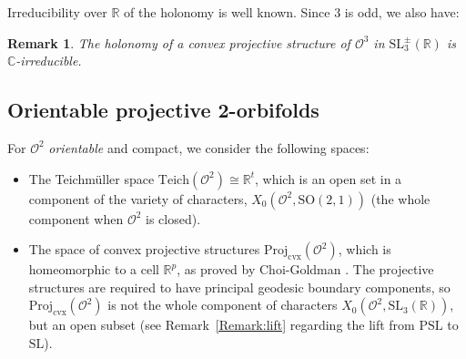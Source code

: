 \documentclass[a4paper,11pt]{article}
\newtheorem{Remark}[Theorem]{Remark}
\begin{document}
Irreducibility over $\mathbb R$ of the holonomy is well known. Since $3$ is odd, we also have:

\begin{Remark}
The holonomy of a convex projective structure of
$\mathcal O^3$ in  $\mathrm{SL}^{\pm}_3(\mathbb R)$ 
is $\mathbb C$-irreducible.
\end{Remark}



\subsection{Orientable projective 2-orbifolds}





For $\mathcal O^2$ \emph{orientable} and compact, we consider the following spaces:
\begin{itemize}
  \item The Teichm\"uller space $\mathrm{Teich}(\mathcal O^2)\cong \mathbb R ^t$, which is an open set in 
  a component of the variety of characters,
  $X_0(\mathcal O^2, \textrm{SO}(2,1))$ 
  (the whole component when $\mathcal O^2$ is closed). 
   \item The space of  convex projective structures  $\mathrm{Proj}_{\mathrm{cvx}}(\mathcal O^2)$, which is homeomorphic to a cell
   $\mathbb R ^p$, as proved by  Choi-Goldman
   \cite{ChoiGoldman}. The 
   projective structures are required to have  principal geodesic boundary components, so $\mathrm{Proj}_{\mathrm{cvx}}(\mathcal O^2)$ is not the whole component  of characters 
   $X_0(\mathcal O^2, \mathrm{SL}_3(\mathbb R))$, 
   but an open subset (see Remark~\ref{Remark:lift} regarding the lift from $\mathrm{PSL}$ to $\mathrm{SL}$).
\end{itemize}




 
\end{document}
